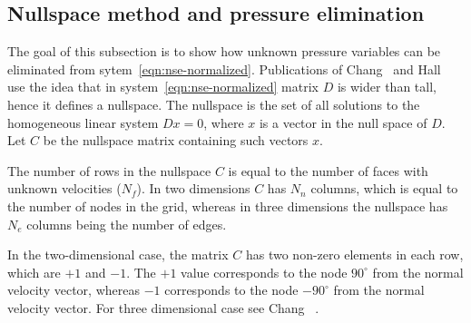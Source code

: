 \documentclass{article}
\begin{document}
\subsection{Nullspace method and pressure elimination}\label{sec:nullspace-method}

The goal of this subsection is to show how unknown pressure variables can be eliminated from sytem~\eqref{eqn:nse-normalized}. Publications of Chang~\cite{Chang:2002} and Hall~\cite{Hall:1980} use the idea that in system~\eqref{eqn:nse-normalized} matrix $D$ is wider than tall, hence it defines a nullspace. The nullspace is the set of all solutions to the homogeneous linear system $Dx = 0$, where $x$ is a vector in the null space of $D$. Let $C$ be the nullspace matrix containing such vectors $x$. 

The number of rows in the nullspace $C$ is equal to the number of faces with unknown velocities ($N_f$). In two dimensions $C$ has $N_n$ columns, which is equal to the number of nodes in the grid, whereas in three dimensions the nullspace has $N_e$ columns being the number of edges. 

In the two-dimensional case, the matrix $C$ has two non-zero elements in each row, which are $+1$ and $-1$. The $+1$ value corresponds to the node $90^\circ$ from the normal velocity vector, whereas $-1$ corresponds to the node $-90^\circ$ from the normal velocity vector.  For three dimensional case see Chang ~\cite{Chang:2002}.

\end{document}
